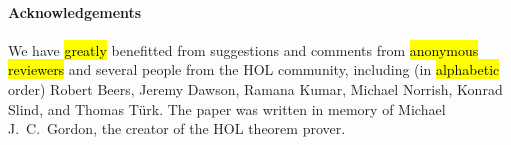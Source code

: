 

\paragraph{Acknowledgements}

We have \hl{greatly} benefitted from suggestions and comments 
from \hl{anonymous reviewers} and several people from the HOL
community, including (in \hl{alphabetic} order) Robert Beers, Jeremy Dawson,
Ramana Kumar,
Michael Norrish, 
Konrad Slind, and
Thomas T\"{u}rk.
%
The paper was written in memory of Michael J.~C.~Gordon, the creator of the HOL theorem prover.
